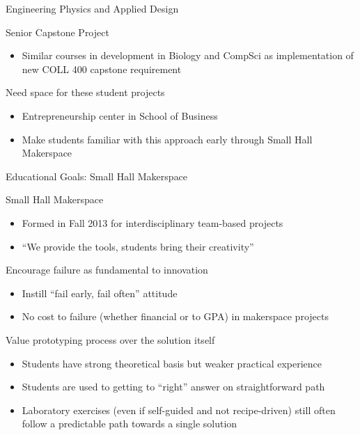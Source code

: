 \documentclass[xcolor=table,compress,professionalfonts,pdfpagelabels]{beamer}
\begin{document}
\begin{frame}[allowframebreaks]{Engineering Physics and Applied Design}
\begin{block}{Senior Capstone Project}
\begin{itemize}
   \item Similar courses in development in Biology and CompSci as implementation of new COLL 400 capstone requirement
  \end{itemize}
 \end{block}
 \begin{block}{Need space for these student projects}
  \begin{itemize}
   \item Entrepreneurship center in School of Business
   \item Make students familiar with this approach early through Small Hall Makerspace
  \end{itemize}
 \end{block}
\end{frame}

\begin{frame}{Educational Goals: Small Hall Makerspace}
 \begin{block}{Small Hall Makerspace}
  \begin{itemize}
   \item Formed in Fall 2013 for interdisciplinary team-based projects 
   \item ``We provide the tools, students bring their creativity''
  \end{itemize}
 \end{block}
 \begin{block}{Encourage failure as fundamental to innovation}
  \begin{itemize}
   \item Instill ``fail early, fail often'' attitude
   \item No cost to failure (whether financial or to GPA) in makerspace projects
  \end{itemize}
 \end{block}
 \begin{block}{Value prototyping process over the solution itself}
  \begin{itemize}
   \item Students have strong theoretical basis but weaker practical experience
   \item Students are used to getting to ``right'' answer on straightforward path
   \item Laboratory exercises (even if self-guided and not recipe-driven) still often follow a predictable path towards a single solution
  \end{itemize}
 \end{block}
\end{frame}
\end{document}
